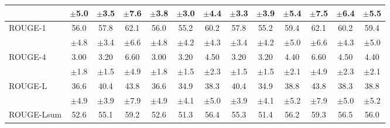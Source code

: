 \documentclass[main.tex]{subfiles}
\begin{document}
\begin{table}[t]
{\begin{tabular}{l@{\hspace{3mm}}*{3}{c}@{\hspace{3mm}}*{3}{c}@{\hspace{3mm}}*{3}{c}@{\hspace{3mm}}*{3}{c}}
                    & {\footnotesize $\pm$5.0} & {\footnotesize $\pm$3.5} & {\footnotesize $\pm$7.6} & {\footnotesize $\pm$3.8} & {\footnotesize $\pm$3.0} & {\footnotesize $\pm$4.4} & {\footnotesize $\pm$3.3} & {\footnotesize $\pm$3.9} & {\footnotesize $\pm$5.4} & {\footnotesize $\pm$7.5} & {\footnotesize $\pm$6.4} & {\footnotesize $\pm$5.5} \\
    \hline
    \multirow{2}{*}{ROUGE-1} & {\normalsize 56.0} & {\normalsize 57.8} & {\normalsize 62.1} & {\normalsize 56.0} & {\normalsize 55.2} & {\normalsize 60.2} & {\normalsize 57.8} & {\normalsize 55.2} & {\normalsize 59.4} & {\normalsize 62.1} & {\normalsize 60.2} & {\normalsize 59.4} \\
                     & {\footnotesize $\pm$4.8} & {\footnotesize $\pm$3.4} & {\footnotesize $\pm$6.6} & {\footnotesize $\pm$4.8} & {\footnotesize $\pm$4.2} & {\footnotesize $\pm$4.3} & {\footnotesize $\pm$3.4} & {\footnotesize $\pm$4.2} & {\footnotesize $\pm$5.0} & {\footnotesize $\pm$6.6} & {\footnotesize $\pm$4.3} & {\footnotesize $\pm$5.0} \\
    \hline
    \multirow{2}{*}{ROUGE-4} & {\normalsize 3.00} & {\normalsize 3.20} & {\normalsize 6.60} & {\normalsize 3.00} & {\normalsize 3.20} & {\normalsize 4.50} & {\normalsize 3.20} & {\normalsize 3.20} & {\normalsize 4.40} & {\normalsize 6.60} & {\normalsize 4.50} & {\normalsize 4.40} \\
                     & {\footnotesize $\pm$1.8} & {\footnotesize $\pm$1.5} & {\footnotesize $\pm$4.9} & {\footnotesize $\pm$1.8} & {\footnotesize $\pm$1.5} & {\footnotesize $\pm$2.3} & {\footnotesize $\pm$1.5} & {\footnotesize $\pm$1.5} & {\footnotesize $\pm$2.1} & {\footnotesize $\pm$4.9} & {\footnotesize $\pm$2.3} & {\footnotesize $\pm$2.1} \\
    \hline
    \multirow{2}{*}{ROUGE-L} & {\normalsize 36.6} & {\normalsize 40.4} & {\normalsize 43.8} & {\normalsize 36.6} & {\normalsize 34.9} & {\normalsize 38.3} & {\normalsize 40.4} & {\normalsize 34.9} & {\normalsize 38.8} & {\normalsize 43.8} & {\normalsize 38.3} & {\normalsize 38.8} \\
                     & {\footnotesize $\pm$4.9} & {\footnotesize $\pm$3.9} & {\footnotesize $\pm$7.9} & {\footnotesize $\pm$4.9} & {\footnotesize $\pm$4.1} & {\footnotesize $\pm$5.0} & {\footnotesize $\pm$3.9} & {\footnotesize $\pm$4.1} & {\footnotesize $\pm$5.2} & {\footnotesize $\pm$7.9} & {\footnotesize $\pm$5.0} & {\footnotesize $\pm$5.2} \\
    \hline
    \multirow{2}{*}{ROUGE-Lsum} & {\normalsize 52.6} & {\normalsize 55.1} & {\normalsize 59.2} & {\normalsize 52.6} & {\normalsize 51.3} & {\normalsize 56.4} & {\normalsize 55.3} & {\normalsize 51.4} & {\normalsize 56.2} & {\normalsize 59.3} & {\normalsize 56.5} & {\normalsize 56.0} \\

\end{tabular}}
\end{table}
\end{document}

